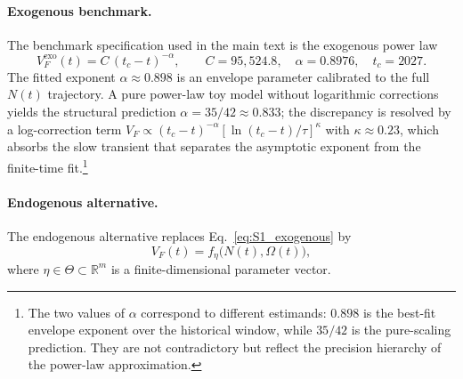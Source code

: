 \documentclass[11pt]{article}
\begin{document}
\paragraph{Exogenous benchmark.}
The benchmark specification used in the main text is the exogenous power law
\begin{equation}
V_F^{\mathrm{exo}}(t)=C\,(t_c-t)^{-\alpha},
\qquad
C=95{,}524.8,\quad
\alpha=0.8976,\quad
t_c=2027.
\label{eq:S1_exogenous}
\end{equation}
The fitted exponent $\alpha\approx 0.898$ is an envelope parameter calibrated to the full $N(t)$ trajectory.  A pure power-law toy model without logarithmic corrections yields the structural prediction $\alpha=35/42\approx 0.833$; the discrepancy is resolved by a log-correction term $V_F\propto(t_c-t)^{-\alpha}[\ln(t_c-t)/\tau]^\kappa$ with $\kappa\approx 0.23$, which absorbs the slow transient that separates the asymptotic exponent from the finite-time fit.\footnote{The two values of $\alpha$ correspond to different estimands: $0.898$ is the best-fit envelope exponent over the historical window, while $35/42$ is the pure-scaling prediction.  They are not contradictory but reflect the precision hierarchy of the power-law approximation.}

\paragraph{Endogenous alternative.}
The endogenous alternative replaces Eq.~\eqref{eq:S1_exogenous} by
\begin{equation}
V_F(t)=f_\eta\!\bigl(N(t),\Omega(t)\bigr),
\label{eq:S1_endogenous}
\end{equation}
where \(\eta\in\Theta\subset\mathbb{R}^m\) is a finite-dimensional parameter vector.
\end{document}
